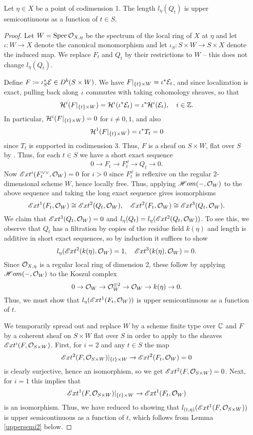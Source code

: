 \begin{lem}\label{uppersemi1}
Let $\eta \in X$ be a point of codimension 1. The length $l_\eta(Q_t)$ is upper semicontinuous as a function of $t \in S$.
\end{lem}
\begin{proof}
Let $W = \operatorname{\mathrm{Spec}} \mathcal{O}_{X,\eta}$ be the spectrum of the local ring of $X$ at $\eta$ and let $\iota: W \to X$ denote the canonical monomorphism and let $\iota_S: S \times W \to S \times X$ denote the induced map. We replace $F_t$ and $Q_t$ by their restrictions to $W$ -- this does not change $l_\eta(Q_t)$.

Define $F \coloneqq \iota_S^*\mathcal{E} \in D^b(S \times W)$. We have $F|_{\{t\} \times W} = \iota^*\mathcal{E}_t$, and since localization is exact, pulling back along $\iota$ commutes with taking cohomology sheaves, so that 
\[ \mathcal{H}^i(F|_{\{t\} \times W}) = \mathcal{H}^i(\iota^*\mathcal{E}_t) = \iota^*\mathcal{H}^i(\mathcal{E}_t), \quad i \in \mathbb{Z}. \]
In particular, $\mathcal{H}^i(F|_{\{t\} \times W}) = 0$ for $i \neq 0, 1$, and also
\[ \mathcal{H}^1(F|_{\{t\} \times W}) = \iota^*T_t = 0 \]
since $T_t$ is supported in codimension 3. Thus, $F$ is a sheaf on $S \times W$, flat over $S$ by \cite[Lemma 3.31]{huy-fourier}. 
Thus, for each $t \in S$ we have a short exact sequence
\[ 0 \to F_t \to F_t^\dd \to Q_t \to 0. \]
Now $\mathscr{E}xt^i(F_t^{\vee\vee}, \mathcal{O}_W) = 0$ for $i > 0$ since $F_t^\dd$ is reflexive on the regular 2-dimensional scheme $W$, hence locally free. Thus, applying $\mathscr{H}om(-, \mathcal{O}_W)$ to the above sequence and taking the long exact sequence gives isomorphisms
\[ \mathscr{E}xt^1(F_t, \mathcal{O}_W) \cong \mathscr{E}xt^2(Q_t, \mathcal{O}_W), \quad \mathscr{E}xt^2(F_t, \mathcal{O}_W) \cong \mathscr{E}xt^3(Q_t, \mathcal{O}_W). \]
We claim that $\mathscr{E}xt^3(Q_t, \mathcal{O}_W) = 0$ and $l_\eta(Q_t) = l_\eta(\mathscr{E}xt^2(Q_t, \mathcal{O}_W))$. To see this, we observe that $Q_t$ has a filtration by copies of the residue field $k(\eta)$ and length is additive in short exact sequences, so by induction it suffices to show
\[ l_\eta(\mathscr{E}xt^2(k(\eta), \mathcal{O}_W) = 1, \quad \mathscr{E}xt^3(k(\eta), \mathcal{O}_W) = 0. \]
Since $\mathcal{O}_{X,\eta}$ is a regular local ring of dimension 2, these follow by applying $\mathscr{H}om(- , \mathcal{O}_W)$ to the Koszul complex
\[ 0 \to \mathcal{O}_W \to \mathcal{O}_W^{\oplus 2} \to \mathcal{O}_W \to k(\eta) \to 0. \]
Thus, we must show that $l_\eta(\mathscr{E}xt^1(F_t, \mathcal{O}_W))$ is upper semicontinuous as a function of $t$.

We temporarily spread out and replace $W$ by a scheme finite type over $\mathbb{C}$ and $F$ by a coherent sheaf on $S \times W$ flat over $S$ in order to apply \cite[Theorem 1.9]{altklei} to the sheaves $\mathscr{E}xt^i(F, \mathcal{O}_{S\times W})$. First, for $i = 2$ and any $t \in S$ the map
\[ \mathscr{E}xt^2(F, \mathcal{O}_{S\times W})|_{\{t\} \times W} \to \mathscr{E}xt^2(F_t, \mathcal{O}_W) = 0 \]
is clearly surjective, hence an isomorphism, so we get $\mathscr{E}xt^2(F, \mathcal{O}_{S \times W}) = 0$. Next, for $i = 1$ this implies that
\[ \mathscr{E}xt^1(F, \mathcal{O}_{S \times W})|_{\{t\} \times W} \to \mathscr{E}xt^1(F_t, \mathcal{O}_W) \]
is an isomorphism. Thus, we have reduced to showing that $l_{(t,\eta)}(\mathscr{E}xt^1(F, \mathcal{O}_{S \times W}))$ is upper semicontinuous as a function of $t$, which follows from Lemma \ref{uppersemi2} below.
\end{proof}

